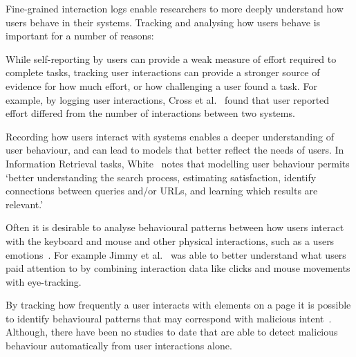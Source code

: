 
Fine-grained interaction logs enable researchers to more deeply understand how users behave in their systems. Tracking and analysing how users behave is important for a number of reasons:

\begin{description}[noitemsep,leftmargin=8pt]
	\item[Evaluation] While self-reporting by users can provide a weak measure of effort required to complete tasks, tracking user interactions can provide a stronger source of evidence for how much effort, or how challenging a user found a task. For example, by logging user interactions, Cross et al.~\cite{cross2021search} found that user reported effort differed from the number of interactions between two systems.
	\item[User Modelling] Recording how users interact with systems enables a deeper understanding of user behaviour, and can lead to models that better reflect the needs of users. In Information Retrieval tasks, White~\cite{white2016interactions} notes that modelling user behaviour permits `better understanding the search process, estimating satisfaction, identify connections between queries and/or URLs, and learning which results are relevant.'
	\item[Multi-Modal Interactions] Often it is desirable to analyse behavioural patterns between how users interact with the keyboard and mouse and other physical interactions, such as a users emotions~\cite{arapakis2008affective}. For example Jimmy et al.~\cite{jimmy2020health} was able to better understand what users paid attention to by combining interaction data like clicks and mouse movements with eye-tracking.
	\item[Malicious Users] By tracking how frequently a user interacts with elements on a page it is possible to identify behavioural patterns that may correspond with malicious intent~\cite{gadiraju2015understanding}. Although, there have been no studies to date that are able to detect malicious behaviour automatically from user interactions alone.
\end{description}